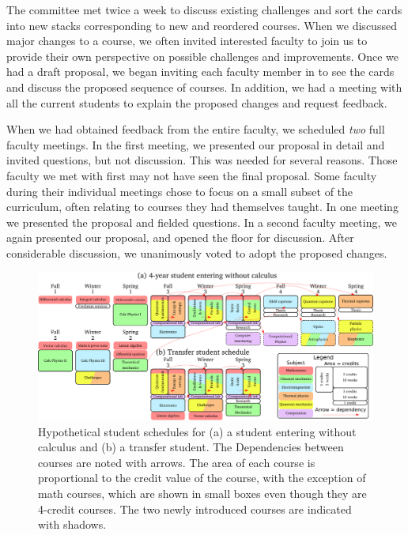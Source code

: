 \documentclass[english,aps,pra,reprint,noshowpacs,superscriptaddress]{revtex4-1}
\begin{document}
The committee met twice a week to discuss existing challenges and sort
the cards into new stacks corresponding to new and reordered courses.
When we discussed major changes to a course, we often invited
interested faculty to join us to provide their own perspective on
possible challenges and improvements.  Once we had a draft proposal,
we began inviting each faculty member in to see the cards and discuss
the proposed sequence of courses.  In addition, we had a meeting with
all the current students to explain the proposed changes and request
feedback.

When we had obtained feedback from the entire faculty, we scheduled
\emph{two} full faculty meetings.  In the first meeting, we presented
our proposal in detail and invited questions, but not discussion.
This was needed for several reasons.  Those faculty we met with first
may not have seen the final proposal.  Some faculty during their
individual meetings chose to focus on a small subset of the
curriculum, often relating to courses they had themselves taught.  In
one meeting we presented the proposal and fielded questions.  In a
second faculty meeting, we again presented our proposal, and opened
the floor for discussion.  After considerable discussion, we
unanimously voted to adopt the proposed changes.

\newcommand\mathcourse[2]{\emph{#1}}
\newcommand\noted[2]{\textbf{#1} (#2)}
\newcommand\paradigm[1]{{\sc #1} (3)}
\newcommand\capstone[1]{#1 (3)}
\newcommand\onecredit[1]{#1 (1)}
\newcommand\threecredit[1]{#1 (3)}
\newcommand\fourcredit[1]{#1 (4)}

\begin{figure}
\includegraphics[width=\textwidth]{schedule}
\caption{Hypothetical student schedules for (a) a student entering
  without calculus and (b) a transfer student.  The Dependencies
  between courses are noted with arrows.  The area of each course is
  proportional to the credit value of the course, with the exception
  of math courses, which are shown in small boxes even though they are
  4-credit courses.  The two newly introduced courses are indicated
  with shadows.\label{fig:schedule}}
\end{figure}
\end{document}
